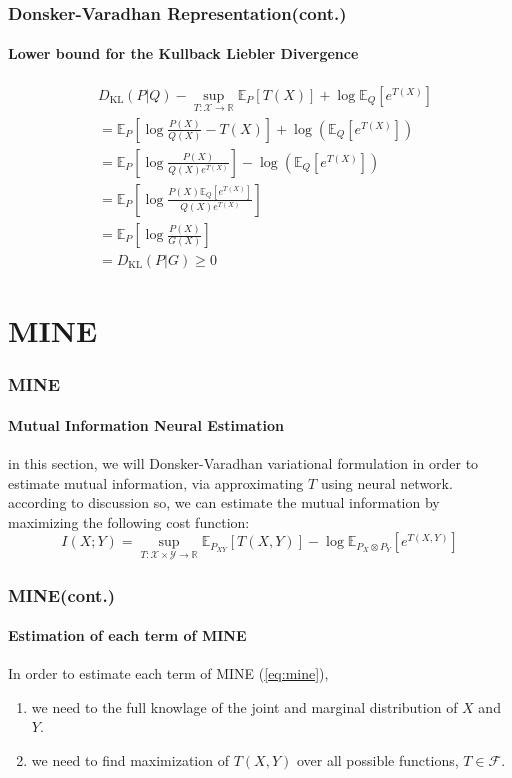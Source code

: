 \documentclass[aspectratio=169]{beamer}
\begin{document}
	\begin{frame}
		\frametitle{Donsker-Varadhan Representation(cont.)}
		\framesubtitle{Lower bound for the Kullback Liebler Divergence}
		\begin{align}
			&D_{\text{KL}}(P | Q) -\sup_{T: \mathcal{X} \rightarrow \mathbb{R}} {\mathbb{E}_P[T(X)] + \log \mathbb{E}_Q[e^{T(X)}]}\\
			&= \mathbb{E}_P[\log \frac{P(X)}{Q(X)}-T(X)] + \log(\mathbb{E}_Q[e^{T(X)}])\\
			&= \mathbb{E}_P[\log \frac{P(X)}{Q(X) e^{T(X)}}] - \log(\mathbb{E}_Q[e^{T(X)}])\\
			&= \mathbb{E}_P[\log \frac{P(X)\mathbb{E}_Q[e^{T(X)}]}{Q(X) e^{T(X)}}]\\
			&= \mathbb{E}_P[\log \frac{P(X)}{G(X)}]\\
			&= D_{\text{KL}}(P|G) \geq 0
		\end{align}
	\end{frame}

	



\section{MINE}
\begin{frame}
	\frametitle{MINE}
	\framesubtitle{Mutual Information Neural Estimation}
	in this section, we will Donsker-Varadhan variational formulation in order to estimate mutual information,
	via approximating $T$ using neural network. according to discussion so,
	we can estimate the mutual information by maximizing the following cost function:
	\begin{equation}\label{eq:mine}
		I(X;Y) = \sup_{T: \mathcal{X} \times \mathcal{Y} \rightarrow \mathbb{R}}
		{\mathbb{E}_{P_{XY}}[T(X,Y)] - \log \mathbb{E}_{P_X \otimes P_Y}[e^{T(X,Y)}]}
	\end{equation}
\end{frame}

\begin{frame}
	\frametitle{MINE(cont.)}
	\framesubtitle{Estimation of each term of MINE}
	In order to estimate each term of MINE (\autoref{eq:mine}),
	\begin{enumerate}
		\item we need to the full knowlage of the joint and marginal distribution of $X$ and $Y$.
		\item we need to find maximization of $T(X,Y)$ over all possible functions, $T \in \mathcal{F}$.
	\end{enumerate}
\end{frame}
\end{document}
